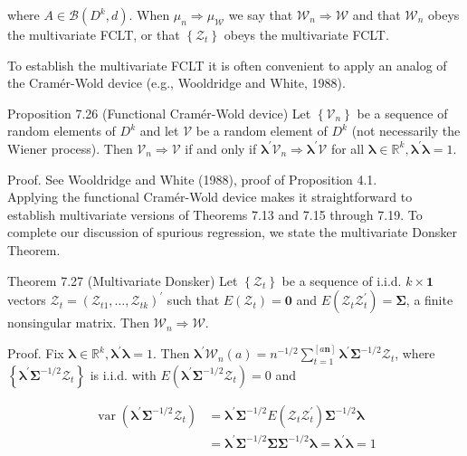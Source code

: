\documentclass[10pt]{article}
\begin{document}
where $A \in \mathcal{B}\left(D^{k}, d\right)$. When $\mu_{n} \Rightarrow \mu_{\mathcal{W}}$ we say that $\mathcal{W}_{n} \Rightarrow \mathcal{W}$ and that $\mathcal{W}_{n}$ obeys the multivariate FCLT, or that $\left\{\mathcal{Z}_{t}\right\}$ obeys the multivariate FCLT.

To establish the multivariate FCLT it is often convenient to apply an analog of the Cramér-Wold device (e.g., Wooldridge and White, 1988).

Proposition 7.26 (Functional Cramér-Wold device) Let $\left\{\mathcal{V}_{n}\right\}$ be a sequence of random elements of $D^{k}$ and let $\mathcal{V}$ be a random element of $D^{k}$ (not necessarily the Wiener process). Then $\mathcal{V}_{n} \Rightarrow \mathcal{V}$ if and only if $\boldsymbol{\lambda}^{\prime} \mathcal{V}_{n} \Rightarrow \boldsymbol{\lambda}^{\prime} \mathcal{V}$ for all $\boldsymbol{\lambda} \in \mathbb{R}^{k}, \boldsymbol{\lambda}^{\prime} \boldsymbol{\lambda}=1$.

Proof. See Wooldridge and White (1988), proof of Proposition 4.1.\\
Applying the functional Cramér-Wold device makes it straightforward to establish multivariate versions of Theorems 7.13 and 7.15 through 7.19. To complete our discussion of spurious regression, we state the multivariate Donsker Theorem.

Theorem 7.27 (Multivariate Donsker) Let $\left\{\mathcal{Z}_{t}\right\}$ be a sequence of i.i.d. $k \times \mathbf{1}$ vectors $\mathcal{Z}_{t}=\left(\mathcal{Z}_{t 1}, \ldots, \mathcal{Z}_{t k}\right)^{\prime}$ such that $E\left(\mathcal{Z}_{t}\right)=\mathbf{0}$ and $E\left(\mathcal{Z}_{t} \mathcal{Z}_{t}^{\prime}\right)=\mathbf{\Sigma}$, a finite nonsingular matrix. Then $\mathcal{W}_{n} \Rightarrow \mathcal{W}$.

Proof. Fix $\boldsymbol{\lambda} \in \mathbb{R}^{k}, \boldsymbol{\lambda}^{\prime} \boldsymbol{\lambda}=1$. Then $\boldsymbol{\lambda}^{\prime} \mathcal{W}_{n}(a)=n^{-1 / 2} \sum_{t=1}^{[a \boldsymbol{n}]} \boldsymbol{\lambda}^{\prime} \boldsymbol{\Sigma}^{-1 / 2} \mathcal{Z}_{t}$, where $\left\{\boldsymbol{\lambda}^{\prime} \boldsymbol{\Sigma}^{-1 / 2} \boldsymbol{\mathcal { Z }}_{t}\right\}$ is i.i.d. with $E\left(\boldsymbol{\lambda}^{\prime} \boldsymbol{\Sigma}^{-1 / 2} \boldsymbol{\mathcal { Z }}_{t}\right)=0$ and

$$
\begin{aligned}
\operatorname{var}\left(\boldsymbol{\lambda}^{\prime} \boldsymbol{\Sigma}^{-1 / 2} \boldsymbol{\mathcal { Z }}_{t}\right) & =\boldsymbol{\lambda}^{\prime} \boldsymbol{\Sigma}^{-1 / 2} E\left(\boldsymbol{\mathcal { Z }}_{t} \boldsymbol{\mathcal { Z }}_{t}^{\prime}\right) \boldsymbol{\Sigma}^{-1 / 2} \boldsymbol{\lambda} \\
& =\boldsymbol{\lambda}^{\prime} \boldsymbol{\Sigma}^{-1 / 2} \boldsymbol{\Sigma} \boldsymbol{\Sigma}^{-1 / 2} \boldsymbol{\lambda}=\boldsymbol{\lambda}^{\prime} \boldsymbol{\lambda}=1
\end{aligned}
$$
\end{document}
